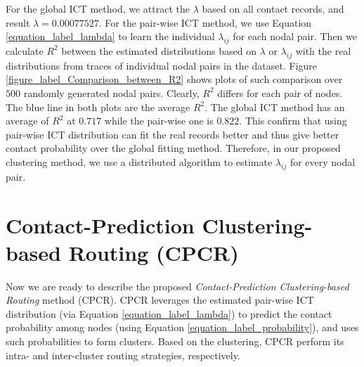 \documentclass[conference]{IEEEtran}
\begin{document}
For the global ICT method,  we attract the $\lambda$ based on all contact records, and result $\lambda= 0.00077527$. For the pair-wise ICT method, we use Equation  \ref{equation_label_lambda} to learn the individual $\lambda_{ij}$ for each nodal pair. Then we calculate  $R^{2}$  between the estimated distributions based on $\lambda$ or $\lambda_{ij}$ with the real distributions from traces of individual nodal pairs in the dataset. Figure \ref{figure_label_Comparison_between_R2} shows plots of such comparison over  $500$ randomly generated nodal pairs. Clearly, $R^{2}$ differs for each pair of nodes. The blue line in both plots are the average $R^{2}$. The global ICT method has an average of $R^{2}$ at $0.717$ while the pair-wise one is $0.822$. This confirm that using pair-wise ICT distribution can fit the real records better and thus give better contact probability over the global fitting method. Therefore, in our proposed clustering method, we use a distributed algorithm to estimate $\lambda_{ij}$ for every nodal pair.

\section{Contact-Prediction Clustering-based Routing (CPCR)}
\label{Section4_algorithm}

Now we are ready to describe the proposed \emph{Contact-Prediction Clustering-based Routing} method (CPCR).
CPCR leverages the estimated pair-wise ICT distribution (via Equation \ref{equation_label_lambda}) to predict the contact probability among nodes (using Equation \ref{equation_label_probability}), and uses such probabilities to form clusters. Based on the clustering,
CPCR perform its intra- and inter-cluster routing strategies, respectively.
\end{document}
